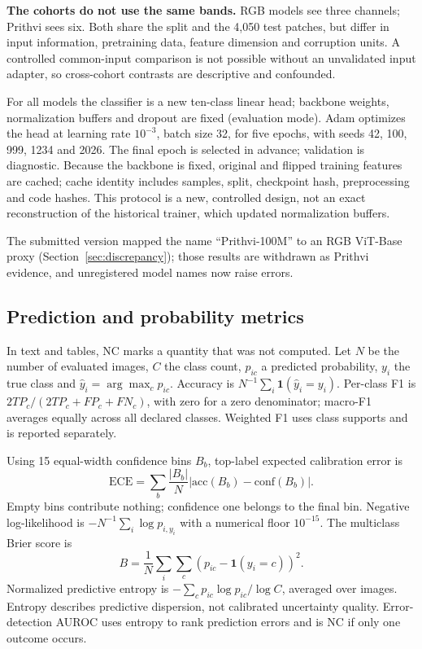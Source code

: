 \documentclass[3p,times,procedia]{elsarticle}
\newcommand{\NC}{\textsc{NC}}
\begin{document}
\textbf{The cohorts do not use the same bands.} RGB models see three channels; Prithvi sees six. Both share the split and the 4,050 test patches, but differ in input information, pretraining data, feature dimension and corruption units. A controlled common-input comparison is not possible without an unvalidated input adapter, so cross-cohort contrasts are descriptive and confounded.

For all models the classifier is a new ten-class linear head; backbone weights, normalization buffers and dropout are fixed (evaluation mode). Adam optimizes the head at learning rate $10^{-3}$, batch size 32, for five epochs, with seeds 42, 100, 999, 1234 and 2026. The final epoch is selected in advance; validation is diagnostic. Because the backbone is fixed, original and flipped training features are cached; cache identity includes samples, split, checkpoint hash, preprocessing and code hashes. This protocol is a new, controlled design, not an exact reconstruction of the historical trainer, which updated normalization buffers.

The submitted version mapped the name ``Prithvi-100M'' to an RGB ViT-Base proxy (Section~\ref{sec:discrepancy}); those results are withdrawn as Prithvi evidence, and unregistered model names now raise errors.

\subsection{Prediction and probability metrics}\label{sec:metrics}
In text and tables, \NC{} marks a quantity that was not computed.
Let $N$ be the number of evaluated images, $C$ the class count, $p_{ic}$ a predicted probability, $y_i$ the true class and $\hat y_i=\arg\max_c p_{ic}$. Accuracy is $N^{-1}\sum_i\mathbf{1}(\hat y_i=y_i)$. Per-class F1 is $2TP_c/(2TP_c+FP_c+FN_c)$, with zero for a zero denominator; macro-F1 averages equally across all declared classes. Weighted F1 uses class supports and is reported separately.

Using 15 equal-width confidence bins $B_b$, top-label expected calibration error is \cite{calibration}
\begin{equation}\mathrm{ECE}=\sum_b\frac{|B_b|}{N}|\mathrm{acc}(B_b)-\mathrm{conf}(B_b)|.\label{eq:ece}\end{equation}
Empty bins contribute nothing; confidence one belongs to the final bin. Negative log-likelihood is $-N^{-1}\sum_i\log p_{i,y_i}$ with a numerical floor $10^{-15}$. The multiclass Brier score is \cite{brier}
\begin{equation}B=\frac1N\sum_i\sum_c(p_{ic}-\mathbf{1}(y_i=c))^2.\label{eq:brier}\end{equation}
Normalized predictive entropy is $-\sum_c p_{ic}\log p_{ic}/\log C$, averaged over images. Entropy describes predictive dispersion, not calibrated uncertainty quality. Error-detection AUROC uses entropy to rank prediction errors and is \NC{} if only one outcome occurs.
\end{document}
